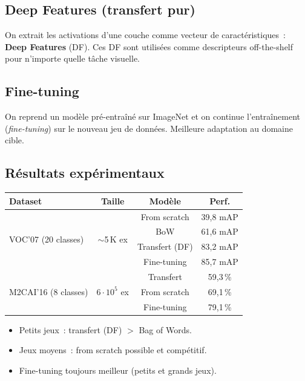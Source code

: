 \documentclass[a4paper,11pt]{article}
\theoremstyle{definition}
\theoremstyle{remark}
\begin{document}
\subsection{Deep Features (transfert pur)}

On extrait les activations d'une couche comme vecteur de
caract\'eristiques~: \textbf{Deep Features} (DF). Ces DF sont
utilis\'ees comme descripteurs \og off-the-shelf\fg{} pour n'importe quelle t\^ache visuelle.

\subsection{Fine-tuning}

On reprend un mod\`ele pr\'e-entra\^in\'e sur ImageNet et on
continue l'entra\^inement (\emph{fine-tuning}) sur le nouveau jeu
de donn\'ees. Meilleure adaptation au domaine cible.

\subsection{R\'esultats exp\'erimentaux}

\begin{center}
\begin{tabular}{lccc}
\toprule
Dataset & Taille & Mod\`ele & Perf. \\
\midrule
\multirow{4}{*}{VOC'07 (20 classes)} & \multirow{4}{*}{$\sim$5\,K ex} & From scratch & 39{,}8 mAP \\
 & & BoW & 61{,}6 mAP \\
 & & Transfert (DF) & 83{,}2 mAP \\
 & & Fine-tuning & 85{,}7 mAP \\
\midrule
\multirow{3}{*}{M2CAI'16 (8 classes)} & \multirow{3}{*}{$6\cdot10^5$ ex} & Transfert & 59{,}3\,\% \\
 & & From scratch & 69{,}1\,\% \\
 & & Fine-tuning & 79{,}1\,\% \\
\bottomrule
\end{tabular}
\end{center}

\begin{itemize}
  \item Petits jeux~: transfert (DF) $>$ Bag of Words.
  \item Jeux moyens~: from scratch possible et comp\'etitif.
  \item Fine-tuning toujours meilleur (petits et grands jeux).
\end{itemize}
\end{document}

